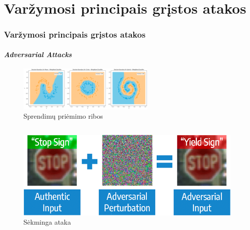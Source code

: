 \section{Varžymosi principais grįstos atakos}
\begin{frame}
    \frametitle{Varžymosi principais grįstos atakos}
    \framesubtitle{\textit{Adversarial Attacks}}
    \begin{figure}
        \begin{small}
            \begin{center}
                \includegraphics[width=0.60\textwidth]{resources/decision_boundaries.png}
            \end{center}
            \caption{Sprendimų priėmimo ribos \cite{VisualisingDecisionBoundaries}}
            \label{fig:decision_boundaries}
        \end{small}
    \end{figure}\pause

    \vspace{-10pt}

    \begin{columns}[b]
        \begin{figure}
            \begin{small}
                \begin{center}
                    \includegraphics[width=\textwidth]{resources/adversarial_example.png}
                \end{center}
                \caption{Sėkminga ataka \cite{AdversarialImagesAttacks}}
                \label{fig:adversarial_example}
            \end{small}
        \end{figure} \pause


\end{columns}
\end{frame}
